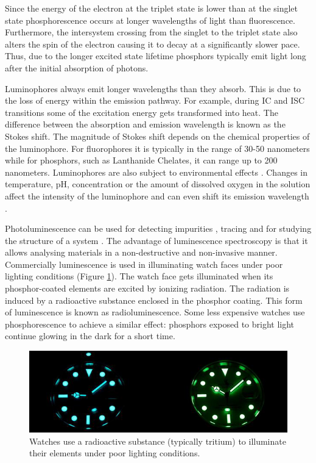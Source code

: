 \documentclass[thesis.tex]{subfiles}
\begin{document}
\noindent Since the energy of the electron at the triplet state is lower than at the singlet state phosphorescence occurs at longer wavelengths of light than fluorescence. Furthermore, the intersystem crossing from the singlet to the triplet state also alters the spin of the electron causing it to decay at a significantly slower pace. Thus, due to the longer excited state lifetime phosphors typically emit light long after the initial absorption of photons. \cite{CEJ}

Luminophores always emit longer wavelengths than they absorb. This is due to the loss of energy within the emission pathway. For example, during IC and ISC transitions some of the excitation energy gets transformed into heat. The difference between the absorption and emission wavelength is known as the Stokes shift. The magnitude of Stokes shift depends on the chemical properties of the luminophore. For fluorophores it is typically in the range of 30-50 nanometers while for phosphors, such as Lanthanide Chelates, it can range up to 200 nanometers. Luminophores are also subject to environmental effects \cite{hemmila}. Changes in temperature, pH, concentration or the amount of dissolved oxygen in the solution affect the intensity of the luminophore and can even shift its emission wavelength \cite{luminescence_basics}.

Photoluminescence can be used for detecting impurities \cite{photoluminescence_use_case_1}, tracing \cite{photoluminescence_use_case_2} and for studying the structure of a system \cite{photoluminescence_use_case_3}. The advantage of luminescence spectroscopy is that it allows analysing materials in a non-destructive and non-invasive manner. Commercially luminescence is used in illuminating watch faces under poor lighting conditions (Figure \ref{figure:photoluminescence_example}). The watch face gets illuminated when its phosphor-coated elements are excited by ionizing radiation. The radiation is induced by a radioactive substance enclosed in the phosphor coating. This form of luminescence is known as radioluminescence. Some less expensive watches use phosphorescence to achieve a similar effect: phosphors exposed to bright light continue glowing in the dark for a short time.

\begin{figure}[hb]
\centering \includegraphics[width=\textwidth]{images/photoluminescence_example}
\caption{Watches use a radioactive substance (typically tritium) to illuminate their elements under poor lighting conditions.\label{figure:photoluminescence_example}}
\end{figure}
\end{document}
